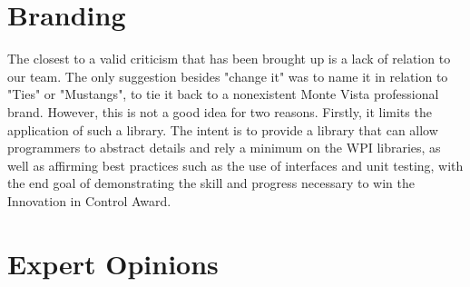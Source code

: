 \documentclass[]{article}
\begin{document}
\section{Branding}
The closest to a valid criticism that has been brought up is a lack of relation to our team. The only suggestion besides "change it" was to name it in relation to "Ties" or "Mustangs", to tie it back to a nonexistent Monte Vista professional brand. However, this is not a good idea for two reasons. Firstly, it limits the application of such a library. The intent is to provide a library that can allow programmers to abstract details and rely a minimum on the WPI libraries, as well as affirming best practices such as the use of interfaces and unit testing, with the end goal of demonstrating the skill and progress necessary to win the Innovation in Control Award. 

\section{Expert Opinions}
\end{document}
